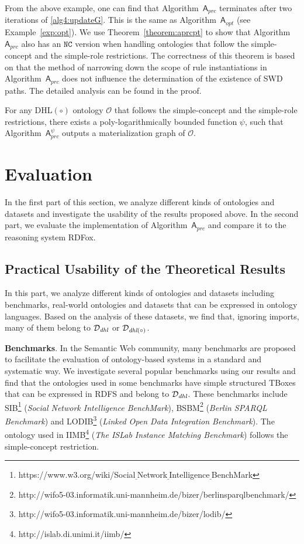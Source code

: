 \documentclass[final,1p,times]{elsarticle}
\begin{document}
From the above example, one can find that Algorithm~$\mathsf{A}_{prc}$ terminates after two iterations
of \ref{alg4:updateG}. This is the same as Algorithm~$\mathsf{A}_{opt}$ (see Example~\ref{exp:opt}).
We use Theorem~\ref{theorem:aprcpt} to show that Algorithm~$\mathsf{A}_{prc}$ also has an $\texttt{NC}$ version when handling ontologies
that follow the simple-concept and the simple-role restrictions.
The correctness of this theorem is based on that the method of narrowing down the scope of rule instantiations in Algorithm~$\mathsf{A}_{prc}$
does not influence the determination of the existence of SWD paths. The detailed analysis
can be found in the proof.

\begin{theorem}\label{theorem:aprcpt}
For any DHL$(\circ)$ ontology $\mathcal{O}$ that follows the simple-concept and the simple-role
restrictions,
there exists a poly-logarithmically bounded function $\psi$,
such that Algorithm~$\mathsf{A}_{prc}^{\psi}$ outputs
a materialization graph of $\mathcal{O}$.
\end{theorem}


\section{Evaluation}
\label{sec:evaluation}

In the first part of this section, we analyze different kinds of ontologies and datasets
and investigate the usability of the results proposed above.
In the second part, we evaluate the implementation of Algorithm~$\mathsf{A}_{prc}$
and compare it to the reasoning system RDFox.

\subsection{Practical Usability of the Theoretical Results}

In this part, we analyze different kinds of ontologies and datasets
including benchmarks, real-world ontologies and
datasets that can be expressed in ontology languages.
Based on the analysis of these datasets,
we find that, ignoring imports, many of them
belong to $\mathcal{D}_{\textit{\text{dhl}}}$ or
$\mathcal{D}_{\textit{\text{dhl}}(\circ)}$.

\textbf{Benchmarks}. In the
Semantic Web community, many benchmarks are proposed to
facilitate the evaluation of ontology-based systems
in a standard and systematic way. We investigate several
popular benchmarks using our results and find that
the ontologies used in some benchmarks have simple
structured TBoxes that can be expressed in RDFS
and belong to $\mathcal{D}_{\textit{\text{dhl}}}$.
These benchmarks include SIB\footnote{https://www.w3.org/wiki/Social$\underline{~}$Network$\underline{~}$Intelligence$\underline{~}$BenchMark}
(\emph{Social Network Intelligence BenchMark}),
BSBM\footnote{http://wifo5-03.informatik.uni-mannheim.de/bizer/berlinsparqlbenchmark/}
(\emph{Berlin SPARQL Benchmark}) and
LODIB\footnote{http://wifo5-03.informatik.uni-mannheim.de/bizer/lodib/}
(\emph{Linked Open Data Integration Benchmark}).
The ontology used in IIMB\footnote{http://islab.di.unimi.it/iimb/}
(\emph{The ISLab Instance Matching Benchmark}) follows the simple-concept restriction.
\end{document}
